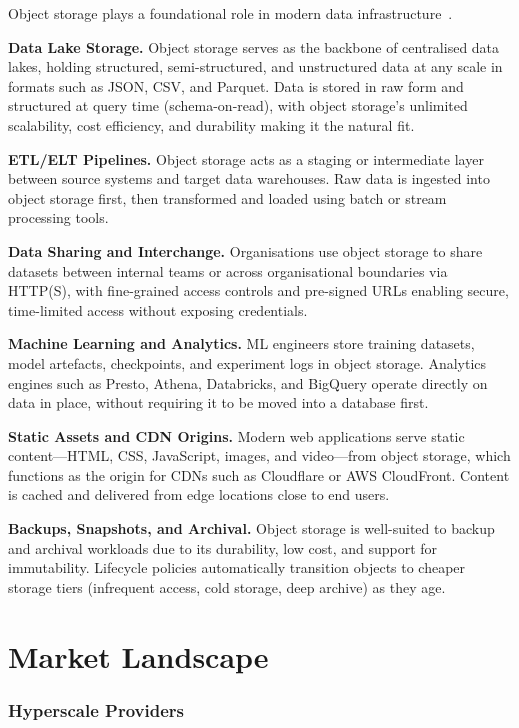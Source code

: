 Object storage plays a foundational role in modern data infrastructure~\cite{cloudian-use-cases,google-cloud-object-storage,layerstack-object-storage}.

\textbf{Data Lake Storage.} Object storage serves as the backbone of centralised data lakes, holding structured, semi-structured, and unstructured data at any scale in formats such as JSON, CSV, and Parquet. Data is stored in raw form and structured at query time (schema-on-read), with object storage's unlimited scalability, cost efficiency, and durability making it the natural fit.

\textbf{ETL/ELT Pipelines.} Object storage acts as a staging or intermediate layer between source systems and target data warehouses. Raw data is ingested into object storage first, then transformed and loaded using batch or stream processing tools.

\textbf{Data Sharing and Interchange.} Organisations use object storage to share datasets between internal teams or across organisational boundaries via HTTP(S), with fine-grained access controls and pre-signed URLs enabling secure, time-limited access without exposing credentials.

\textbf{Machine Learning and Analytics.} ML engineers store training datasets, model artefacts, checkpoints, and experiment logs in object storage. Analytics engines such as Presto, Athena, Databricks, and BigQuery operate directly on data in place, without requiring it to be moved into a database first.

\textbf{Static Assets and CDN Origins.} Modern web applications serve static content---HTML, CSS, JavaScript, images, and video---from object storage, which functions as the origin for CDNs such as Cloudflare or AWS CloudFront. Content is cached and delivered from edge locations close to end users.

\textbf{Backups, Snapshots, and Archival.} Object storage is well-suited to backup and archival workloads due to its durability, low cost, and support for immutability. Lifecycle policies automatically transition objects to cheaper storage tiers (infrequent access, cold storage, deep archive) as they age.

\section{Market Landscape}\label{sec:market}

\subsubsection{Hyperscale Providers}

